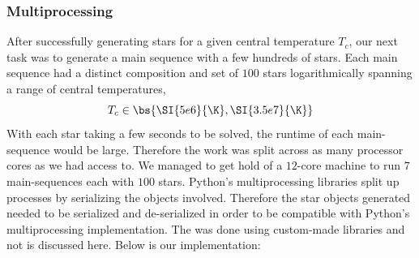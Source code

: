 \documentclass[11pt]{article}
\begin{document}
    \subsubsection{Multiprocessing}
    After successfully generating stars for a given central temperature $T_c$, our next task was to generate a main sequence with a few hundreds of stars. Each main sequence had a distinct composition and set of $100$ stars logarithmically spanning a range of central temperatures,
    \[ T_c \in \bs{\SI{5e6}{\K},\SI{3.5e7}{\K}} \]
    With each star taking a few seconds to be solved, the runtime of each main-sequence would be large. Therefore the work was split across as many processor cores as we had access to. We managed to get hold of a $12$-core machine to run $7$ main-sequences each with $100$ stars. Python's multiprocessing libraries split up processes by serializing the objects involved. Therefore the star objects generated needed to be serialized and de-serialized in order to be compatible with Python's multiprocessing implementation. The was done using custom-made libraries and not is discussed here. Below is our implementation:
\end{document}
